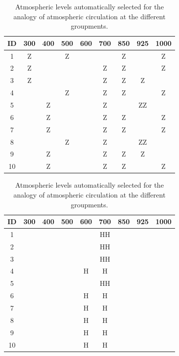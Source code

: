 \documentclass[twocol]{ametsoc}
\begin{document}
\begin{table}[htbp]
	\footnotesize
	\caption{Atmospheric levels automatically selected for the analogy of atmospheric circulation at the different groupments.}
	\begin{center}
		\begin{tabular}{ccccccccc}
			\hline \textbf{ID} & \textbf{300} & \textbf{400} & \textbf{500} & \textbf{600} & \textbf{700} & \textbf{850} & \textbf{925} & \textbf{1000} \\ 
			\hline 
			1  & Z &   & Z &   &   & Z &   & Z \\
			2  & Z &   &   &   & Z & Z &   & Z \\
			3  & Z &   &   &   & Z & Z & Z &   \\
			4  &   &   & Z &   & Z & Z &   & Z \\
			5  &   & Z &   &   & Z &   & ZZ &   \\
			6  &   & Z &   &   & Z & Z &   & Z \\
			7  &   & Z &   &   & Z & Z &   & Z \\
			8  &   &   & Z &   & Z &   & ZZ &   \\
			9  &   & Z &   &   & Z & Z & Z &   \\
			10 &   & Z &   &   & Z & Z &   & Z \\
			\hline 
		\end{tabular} 
	\end{center}
	\label{table:levels_GA_z4_hi2}
\end{table}

\begin{table}[htbp]
	\footnotesize
	\caption{Atmospheric levels automatically selected for the analogy of atmospheric circulation at the different groupments.}
	\begin{center}
		\begin{tabular}{ccccccccc}
			\hline \textbf{ID} & \textbf{300} & \textbf{400} & \textbf{500} & \textbf{600} & \textbf{700} & \textbf{850} & \textbf{925} & \textbf{1000} \\ 
			\hline 
			1  &   &   &   &   & HH &   &   &   \\
			2  &   &   &   &   & HH &   &   &   \\
			3  &   &   &   &   & HH &   &   &   \\
			4  &   &   &   & H & H &   &   &   \\
			5  &   &   &   &   & HH &   &   &   \\
			6  &   &   &   & H & H &   &   &   \\
			7  &   &   &   & H & H &   &   &   \\
			8  &   &   &   & H & H &   &   &   \\
			9  &   &   &   & H & H &   &   &   \\
			10 &   &   &   & H & H &   &   &   \\
			\hline 
		\end{tabular} 
	\end{center}
	\label{table:levels_GA_z4_hi2_H}
\end{table}
\end{document}
